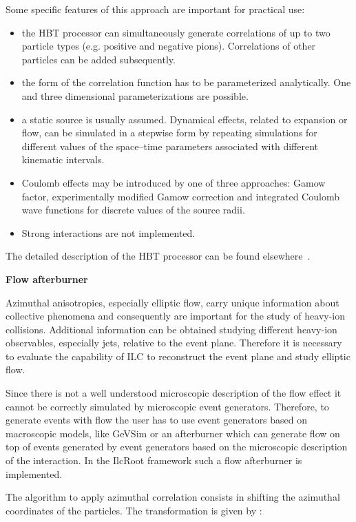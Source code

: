 \documentclass[12pt,a4paper,twoside]{article}
\begin{document}
Some specific features of this approach are important for practical
use:
\begin{itemize}
\item{} the HBT processor can simultaneously generate correlations of up
  to two particle types (e.g. positive and negative pions).
  Correlations of other particles can be added subsequently.
\item{} the form of the correlation function has to be parameterized
  analytically.  One and three dimensional parameterizations are
  possible.
\item{} a static source is usually assumed. Dynamical effects,
  related to
  expansion or flow, can be simulated in a stepwise form by repeating
  simulations for different values of the space--time parameters
  associated with different kinematic intervals.
\item{} Coulomb effects may be introduced by one of three
  approaches: Gamow
  factor, experimentally modified Gamow correction and integrated
  Coulomb wave functions for discrete values of the source radii.
\item{} Strong interactions are not implemented.
\end{itemize}

The detailed description of the HBT processor can be found
elsewhere~\cite{MC:PiotrSk}.

\textbf{Flow afterburner}

Azimuthal anisotropies, especially elliptic flow, carry unique
information about collective phenomena and consequently are
important for the study of heavy-ion collisions.  Additional
information can be obtained studying different heavy-ion
observables, especially jets, relative to the event plane.
Therefore it is necessary to evaluate the capability of ILC to
reconstruct the event plane and study elliptic flow.

Since there is not a well understood microscopic description of
the flow effect it cannot be correctly simulated by microscopic
event generators.  Therefore, to generate events with flow the user has
to use event generators based on macroscopic models, like GeVSim
\cite{MC:GEVSIM} or an afterburner which can generate flow on top
of events generated by event generators based on the microscopic
description of the interaction.  In the IlcRoot framework such a
flow afterburner is implemented.

The algorithm to apply azimuthal correlation consists in shifting the
azimuthal coordinates of the particles.  The transformation is given
by \cite{MC:POSCANCER}:
\end{document}
